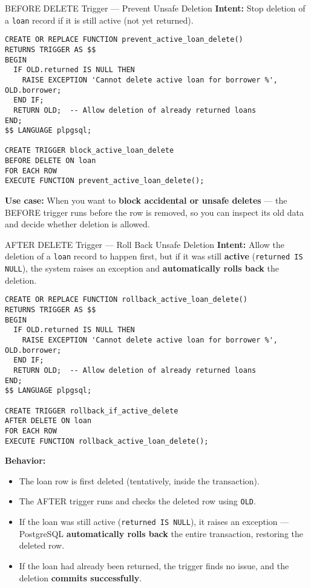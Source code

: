 \documentclass{beamer}
\begin{document}
\begin{frame}[fragile]{BEFORE DELETE Trigger — Prevent Unsafe Deletion}
\small
\textbf{Intent:} Stop deletion of a \texttt{loan} record if it is still active (not yet returned).\\[2mm]
\begin{lstlisting}
CREATE OR REPLACE FUNCTION prevent_active_loan_delete()
RETURNS TRIGGER AS $$
BEGIN
  IF OLD.returned IS NULL THEN
    RAISE EXCEPTION 'Cannot delete active loan for borrower %', OLD.borrower;
  END IF;
  RETURN OLD;  -- Allow deletion of already returned loans
END;
$$ LANGUAGE plpgsql;

CREATE TRIGGER block_active_loan_delete
BEFORE DELETE ON loan
FOR EACH ROW
EXECUTE FUNCTION prevent_active_loan_delete();
\end{lstlisting}

\textcolor{nus-blue}{\textbf{Use case:}}  
When you want to \textbf{block accidental or unsafe deletes} —  
the BEFORE trigger runs before the row is removed,  
so you can inspect its old data and decide whether deletion is allowed.
\end{frame}

\begin{frame}[fragile]{AFTER DELETE Trigger — Roll Back Unsafe Deletion}
\scriptsize
\textbf{Intent:} Allow the deletion of a \texttt{loan} record to happen first,  
but if it was still \textbf{active} (\texttt{returned IS NULL}),  
the system raises an exception and \textbf{automatically rolls back} the deletion.

\begin{lstlisting}
CREATE OR REPLACE FUNCTION rollback_active_loan_delete()
RETURNS TRIGGER AS $$
BEGIN
  IF OLD.returned IS NULL THEN
    RAISE EXCEPTION 'Cannot delete active loan for borrower %', OLD.borrower;
  END IF;
  RETURN OLD;  -- Allow deletion of already returned loans
END;
$$ LANGUAGE plpgsql;

CREATE TRIGGER rollback_if_active_delete
AFTER DELETE ON loan
FOR EACH ROW
EXECUTE FUNCTION rollback_active_loan_delete();
\end{lstlisting}

\tiny
\textcolor{nus-blue}{\textbf{Behavior:}}
\begin{itemize}
  \item The loan row is first deleted (tentatively, inside the transaction).
  \item The AFTER trigger runs and checks the deleted row using \texttt{OLD}.
  \item If the loan was still active (\texttt{returned IS NULL}),  
        it raises an exception — PostgreSQL \textbf{automatically rolls back}  
        the entire transaction, restoring the deleted row.
  \item If the loan had already been returned, the trigger finds no issue,  
        and the deletion \textbf{commits successfully}.
\end{itemize}
\end{frame}
\end{document}
